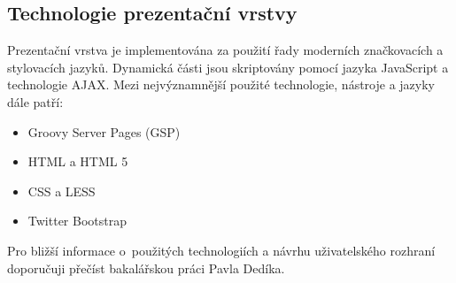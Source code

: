 \subsection{Technologie prezentační vrstvy}
Prezentační vrstva je implementována za použití řady moderních značkovacích a stylovacích jazyků. Dynamická části jsou skriptovány pomocí jazyka JavaScript a technologie AJAX. Mezi nejvýznamnější použité technologie, nástroje a jazyky dále patří:

\begin{itemize}
\item  Groovy Server Pages (GSP)
\item HTML a HTML 5
\item  CSS a LESS
\item Twitter Bootstrap
\end{itemize}

Pro bližší informace o~použitých technologiích a návrhu uživatelského rozhraní doporučuji přečíst bakalářskou práci Pavla Dedíka\cite{pavel-bp}.
